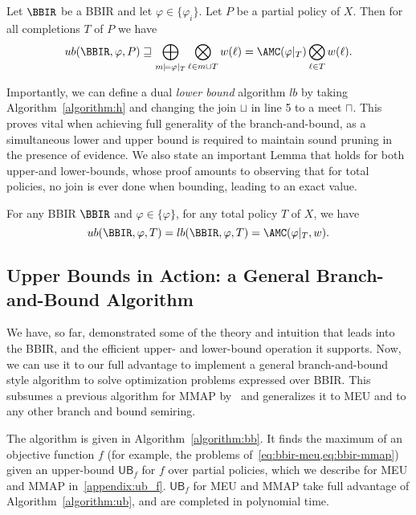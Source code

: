\begin{theorem}\label{thm:ub correctness}
  Let $\BBIR$ be a BBIR and let $\varphi \in \{\varphi_i\}$. Let $P$ be a partial policy of $X$.
  Then for all completions $T$ of $P$ we have
  \begin{equation}\label{eq:ub correctness}
    ub(\BBIR, \varphi, P)
      \sqsupseteq \bigoplus_{m \models \varphi|_T} \bigotimes_{\ell \in m \cup T} w(\ell)
      = \AMC(\varphi|_T) \bigotimes_{\ell \in T} w(\ell).
  \end{equation}
\end{theorem}

Importantly, we can define a dual \textit{lower bound} algorithm $lb$
by taking Algorithm~\ref{algorithm:h}
and changing the join $\sqcup$ in line 5 to a meet $\sqcap$.
This proves vital when achieving full generality of the branch-and-bound,
as a simultaneous
lower and upper bound is required to maintain sound pruning in the presence of evidence.
We also state an important Lemma
that holds for both upper-and lower-bounds,
whose proof amounts to observing that for
total policies, no join is ever done when bounding,
leading to an exact value.

\begin{lemma}\label{lemma:ub on total policy is amc}
  For any BBIR $\BBIR$ and $\varphi \in \{\varphi\}$, for any total policy $T$
  of $X$, we have
  \begin{equation}
    ub(\BBIR, \varphi, T) =lb(\BBIR, \varphi, T)= \AMC(\varphi|_T, w).
  \end{equation}
\end{lemma}

\subsection{Upper Bounds in Action: a General Branch-and-Bound Algorithm}
\label{subsec:meu with evidence}

We have, so far, demonstrated some of the theory and intuition that leads into
the BBIR, and the efficient upper- and lower-bound operation it supports.
Now,
we can use it to our full advantage to implement a general branch-and-bound style
algorithm to solve optimization problems expressed over BBIR.
This subsumes a previous algorithm for MMAP by~\citet{huang2006solving}
and generalizes it to MEU and to any other branch and bound semiring.

The algorithm is given in Algorithm~\ref{algorithm:bb}. It finds the maximum of an
objective function $f$
(for example, the problems of~\cref{eq:bbir-meu,eq:bbir-mmap})
given an upper-bound $\mathsf{UB}_f$ for $f$ over partial policies,
which we describe for MEU and MMAP in~\cref{appendix:ub_f}.
$\mathsf{UB}_f$ for MEU and MMAP take full advantage of
Algorithm~\ref{algorithm:ub}, and are completed in polynomial time.

